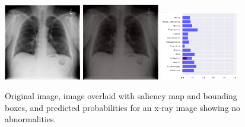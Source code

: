 \documentclass[8pt]{beamer}
\begin{document}
\begin{frame}
\begin{figure}[H]
  \centering
  \includegraphics[width=0.3\textwidth]{images/preds/no_finding}\hspace{0.01\textwidth}%
  \includegraphics[width=0.3\textwidth]{images/preds/no_finding_cam}\hspace{0.01\textwidth}%
  \includegraphics[width=0.3\textwidth]{images/preds/no_finding_probs}\\[0.01\textwidth]
  \caption{Original image, image overlaid with saliency map and bounding boxes,
    and predicted probabilities for an x-ray image showing no abnormalities.}
  \label{examples_15}
\end{figure}
\end{frame}
\end{document}
